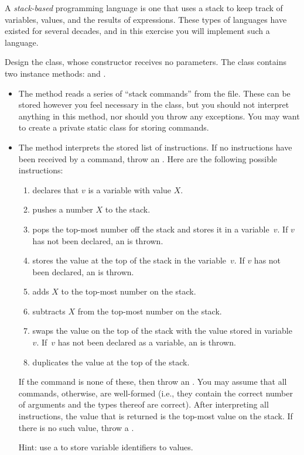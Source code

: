 A \emph{stack-based} programming language is one that uses a stack to keep track of variables, values, and the results of expressions. These types of languages have existed for several decades, and in this exercise you will implement such a language.

Design the  class, whose constructor receives no parameters. The class contains two instance methods:  and . 

\begin{itemize}
    \item The  method reads a series of ``stack commands'' from the file. These can be stored however you feel necessary in the class, but you should not interpret anything in this method, nor should you throw any exceptions. You may want to create a private static class for storing commands.
    \item The  method interprets the stored list of instructions. If no instructions have been received by a  command, throw an . Here are the following possible instructions:

    \begin{enumerate}[label=(\alph*)]
        \item {} declares that $v$ is a variable with value $X$.
        \item {} pushes a number $X$ to the stack. 
        \item {} pops the top-most number off the stack and stores it in a variable~$v$. If $v$ has not been declared, an  is thrown.
        \item {} stores the value at the top of the stack in the variable~$v$. If $v$ has not been declared, an  is thrown.
        \item {} adds $X$ to the top-most number on the stack.
        \item {} subtracts $X$ from the top-most number on the stack.
        \item {} swaps the value on the top of the stack with the value stored in variable~$v$. If~$v$ has not been declared as a variable, an  is thrown.
        \item {} duplicates the value at the top of the stack.
    \end{enumerate}
    If the command is none of these, then throw an . You may assume that all commands, otherwise, are well-formed (i.e., they contain the correct number of arguments and the types thereof are correct).
    After interpreting all instructions, the value that is returned is the top-most value on the stack. If there is no such value, throw a .

    Hint: use a  to store variable identifiers to values.
\end{itemize}

